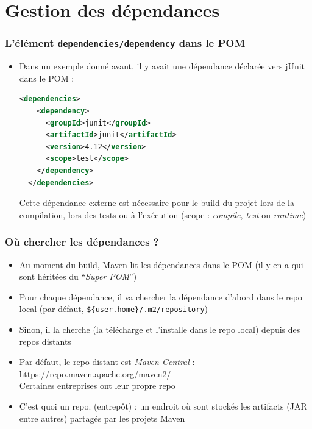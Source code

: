 \documentclass{beamer}
\begin{document}
\section{Gestion des dépendances}
\begin{frame}[fragile]
  \frametitle{L'élément \texttt{dependencies/dependency} dans le POM}
\begin{itemize}
\item Dans un exemple donné avant, il y avait une dépendance déclarée
  vers jUnit dans le POM :
  \begin{lstlisting}[language=XML,basicstyle=\scriptsize]
  <dependencies>
    <dependency>
      <groupId>junit</groupId>
      <artifactId>junit</artifactId>
      <version>4.12</version>
      <scope>test</scope>
    </dependency>
  </dependencies>
\end{lstlisting}
Cette dépendance externe est nécessaire pour le build du projet lors
de la compilation, lors des tests ou à l'exécution (scope :
\textit{compile}, \textit{test} ou \textit{runtime})
\end{itemize}
\end{frame}

\begin{frame}[fragile]
  \frametitle{Où chercher les dépendances ?}
\begin{itemize}
\item Au moment du build, Maven lit les dépendances dans le POM (il y
  en a qui sont héritées du ``\textit{Super POM}'')
\item Pour chaque dépendance, il va chercher la dépendance d'abord
  dans le repo local (par défaut,
 {\footnotesize \texttt{\$\{user.home\}/.m2/repository}})
\item Sinon, il la cherche (la télécharge et l'installe dans le repo
  local) depuis des repos distants
\item Par défaut, le repo distant est \textit{Maven Central} :\\
  {\footnotesize \url{https://repo.maven.apache.org/maven2/}}\\
  Certaines entreprises ont leur propre repo
\item C'est quoi un repo. (entrepôt) : un endroit où sont stockés les
  artifacts (JAR entre autres) partagés par les projets Maven
\end{itemize}
\end{frame}
\end{document}
